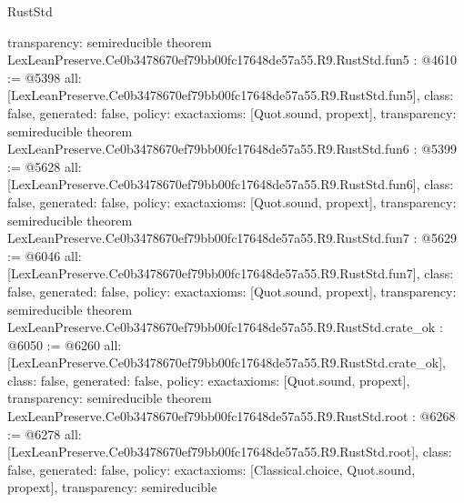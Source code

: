 \begin{lexlean}{RustStd}
\begin{coremodule}
{  transparency: semireducible
}
theorem LexLeanPreserve.Ce0b3478670ef79bb00fc17648de57a55.R9.RustStd.fun5 : @4610 := @5398 {
  all: [LexLeanPreserve.Ce0b3478670ef79bb00fc17648de57a55.R9.RustStd.fun5],
  class: false,
  generated: false,
  policy: exact{axioms: [Quot.sound, propext]},
  transparency: semireducible
}
theorem LexLeanPreserve.Ce0b3478670ef79bb00fc17648de57a55.R9.RustStd.fun6 : @5399 := @5628 {
  all: [LexLeanPreserve.Ce0b3478670ef79bb00fc17648de57a55.R9.RustStd.fun6],
  class: false,
  generated: false,
  policy: exact{axioms: [Quot.sound, propext]},
  transparency: semireducible
}
theorem LexLeanPreserve.Ce0b3478670ef79bb00fc17648de57a55.R9.RustStd.fun7 : @5629 := @6046 {
  all: [LexLeanPreserve.Ce0b3478670ef79bb00fc17648de57a55.R9.RustStd.fun7],
  class: false,
  generated: false,
  policy: exact{axioms: [Quot.sound, propext]},
  transparency: semireducible
}
theorem LexLeanPreserve.Ce0b3478670ef79bb00fc17648de57a55.R9.RustStd.crate_ok : @6050 := @6260 {
  all: [LexLeanPreserve.Ce0b3478670ef79bb00fc17648de57a55.R9.RustStd.crate_ok],
  class: false,
  generated: false,
  policy: exact{axioms: [Quot.sound, propext]},
  transparency: semireducible
}
theorem LexLeanPreserve.Ce0b3478670ef79bb00fc17648de57a55.R9.RustStd.root : @6268 := @6278 {
  all: [LexLeanPreserve.Ce0b3478670ef79bb00fc17648de57a55.R9.RustStd.root],
  class: false,
  generated: false,
  policy: exact{axioms: [Classical.choice, Quot.sound, propext]},
  transparency: semireducible
}


\end{coremodule}
\end{lexlean}
